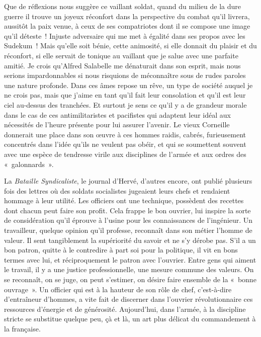 \documentclass[french,twoside]{book} %
\begin{document}
\noindent Que de réflexions nous suggère ce vaillant soldat, quand du milieu de la dure guerre il trouve un joyeux réconfort dans la perspective du combat qu’il livrera, aussitôt la paix venue, à ceux de ses compatriotes dont il se compose une image qu’il déteste ! Injuste adversaire qui me met à égalité dans ses propos avec les Sudekum ! Mais qu’elle soit bénie, cette animosité, si elle donnait du plaisir et du réconfort, si elle servait de tonique au vaillant que je salue avec une parfaite amitié. Je crois qu’Alfred Salabelle me dénaturait dans son esprit, mais nous serions impardonnables si nous risquions de méconnaître sous de rudes paroles une nature profonde. Dans ces âmes repose un rêve, un type de société auquel je ne crois pas, mais que j’aime en tant qu’il fait leur consolation et qu’il est leur ciel au-dessus des tranchées. Et surtout je sens ce qu’il y a de grandeur morale dans le cas de ces antimilitaristes et pacifistes qui adaptent leur idéal aux nécessités de l’heure présente pour lui assurer l’avenir. Le vieux Corneille donnerait une place dans son œuvre à ces hommes raidis, cabrés, furieusement concentrés dans l’idée qu’ils ne veulent pas obéir, et qui se soumettent souvent avec une espèce de tendresse virile aux disciplines de l’armée et aux ordres des « galonnards ».‌\par
La {\itshape Bataille Syndicaliste}, le journal d’Hervé, d’autres encore, ont publié plusieurs fois des lettres où des soldats socialistes jugeaient leurs chefs et rendaient hommage à leur utilité. Les officiers ont une technique, possèdent des recettes dont chacun peut faire son profit. Cela frappe le bon ouvrier, lui inspire la sorte de considération qu’il éprouve à l’usine pour les connaissances de l’ingénieur. Un travailleur, quelque opinion qu’il professe, reconnaît dans son métier l’homme de valeur. Il sent tangiblement la supériorité du savoir et ne s’y dérobe pas. S’il a un bon patron, quitte à le contredire à part soi pour la politique, il vit en bons termes avec lui, et réciproquement le patron avec l’ouvrier. Entre gens qui aiment le travail, il y a une justice professionnelle, une mesure commune des valeurs. On se reconnaît, on se juge, on peut s’estimer, on désire faire ensemble de la « bonne ouvrage ». Un officier qui est à la hauteur de son rôle de chef, c’est-à-dire d’entraîneur d’hommes, a vite fait de discerner dans l’ouvrier révolutionnaire ces ressources d’énergie et de générosité. Aujourd’hui, dans l’armée, à la discipline stricte se substitue quelque peu, çà et là, un art plus délicat du commandement à la française.‌\par
\end{document}
